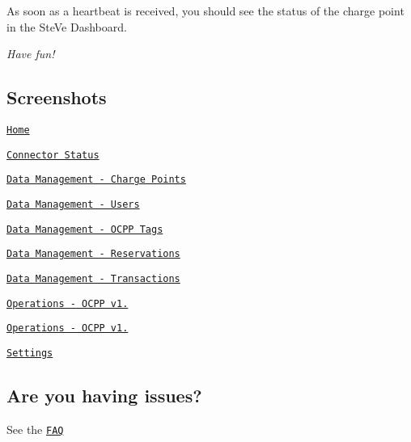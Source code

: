 As soon as a heartbeat is received, you should see the status of the charge point in the Ste\+Ve Dashboard.

{\itshape Have fun!}

\subsection*{Screenshots }


\begin{DoxyEnumerate}
\item \href{website/screenshots/home.png}{\tt Home}
\item \href{website/screenshots/connector-status.png}{\tt Connector Status}
\item \href{website/screenshots/chargepoints.png}{\tt Data Management -\/ Charge Points}
\item \href{website/screenshots/users.png}{\tt Data Management -\/ Users}
\item \href{website/screenshots/ocpp-tags.png}{\tt Data Management -\/ O\+C\+P\+P Tags}
\item \href{website/screenshots/reservations.png}{\tt Data Management -\/ Reservations}
\item \href{website/screenshots/transactions.png}{\tt Data Management -\/ Transactions}
\item \href{website/screenshots/ocpp12.png}{\tt Operations -\/ O\+C\+P\+P v1.}
\item \href{website/screenshots/ocpp15.png}{\tt Operations -\/ O\+C\+P\+P v1.}
\item \href{website/screenshots/settings.png}{\tt Settings}
\end{DoxyEnumerate}

\subsection*{Are you having issues? }

See the \href{https://github.com/RWTH-i5-IDSG/steve/wiki/FAQ}{\tt F\+A\+Q} 
